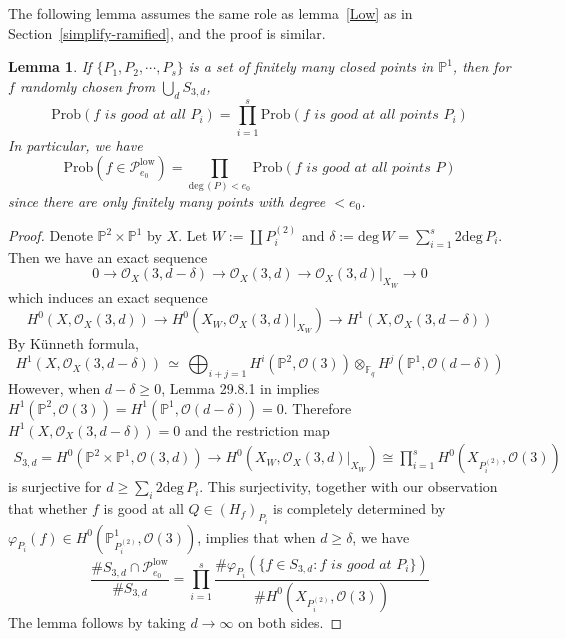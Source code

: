 \documentclass[12pt]{article}
\theoremstyle{plain}
\newtheorem{lemma}[equation]{Lemma}
\theoremstyle{definition}
\newcommand{\IF}{\mathbb{F}}
\newcommand{\IP}{\mathbb{P}}
\newcommand{\sO}{\mathcal{O}}
\newcommand{\sP}{\mathcal{P}}
\renewcommand{\deg}{\mathrm{deg}\,}
\newcommand\iso{{\, \simeq \,}}
\newcommand\tensor{{\otimes}}
\newcommand\union{\bigcup}
\newcommand{\<}{\langle}
\renewcommand{\>}{\rangle}
\newcommand{\Prob}{\mathrm{Prob}}
\begin{document}
The following lemma assumes the same role as lemma~\ref{Low} as in Section~\ref{simplify-ramified}, and the proof is similar. 
\begin{lemma}
\label{pointsurj}
If $\{P_1, P_2, \cdots, P_s\}$ is a set of finitely many closed points in $\IP^1$, then for $f$ randomly chosen from $\union_d S_{3, d}$,
$$ \Prob(f \textit{ is good at all } P_i) = \prod_{i = 1}^s \Prob( f \textit{ is good at all points } P_i) $$
In particular, we have
$$\Prob(f \in \sP_{e_0}^{\mathrm{low}})  = \prod_{\deg(P) < e_0}  \Prob( f \textit{ is good at all points } P ) $$
since there are only finitely many points with degree $< e_0$. 
\end{lemma}
\begin{proof} 
Denote $\IP^2 \times \IP^1$ by $X$. Let $W := \coprod P_i^{(2)}$ and $\delta := \deg W = \sum_{i = 1}^s 2 \deg P_i$. Then we have an exact sequence 
$$ 0 \to \sO_X(3, d - \delta) \to \sO_X(3, d) \to \sO_X(3, d)|_{X_W} \to 0  $$
which induces an exact sequence 
$$ H^0(X, \sO_X(3, d)) \to H^0(X_W, \sO_X(3, d)|_{X_W}) \to H^1(X, \sO_X(3, d - \delta)) $$
By K{\"u}nneth formula, 
$$ H^1(X, \sO_X(3, d - \delta)) \iso \bigoplus_{i + j = 1} H^i(\IP^2, \sO(3))\tensor_{\IF_q} H^j(\IP^1, \sO(d - \delta))   $$
However, when $d - \delta \ge 0$, Lemma 29.8.1 in \cite[Tag 01XS]{stacks-project} implies $H^1(\IP^2, \sO(3)) = H^1(\IP^1, \sO(d - \delta)) = 0$. 
Therefore $H^1(X, \sO_X(3, d - \delta)) = 0$ and the restriction map
\begin{align*}
S_{3, d} = H^0(\IP^2 \times \IP^1, \sO(3, d)) \to H^0(X_W, \sO_X(3, d)|_{X_W}) \cong \prod_{i = 1}^s H^0(X_{P_i^{(2)}}, \sO(3))
\end{align*}
is surjective for $ d \ge \sum_i 2 \deg P_i$. This surjectivity, together with our observation that whether $f$ is good at all $Q \in (H_f)_{P_i}$ is completely determined by $\varphi_{P_i}(f) \in H^0(\IP^1_{P_i^{(2)}}, \sO(3))$, implies that when $d \ge \delta$, we have 
$$ \frac{\# S_{3, d} \cap \sP_{e_0}^{\mathrm{low}}}{\# S_{3, d}} = \prod_{i = 1}^s \frac{\# \varphi_{P_i}(\{ f \in S_{3, d} : f \textit{ is good at }P_i\})}{\# H^0(X_{P^{(2)}_i}, \sO(3))} $$
The lemma follows by taking $d \to \infty$ on both sides. 
\end{proof}
\end{document}
